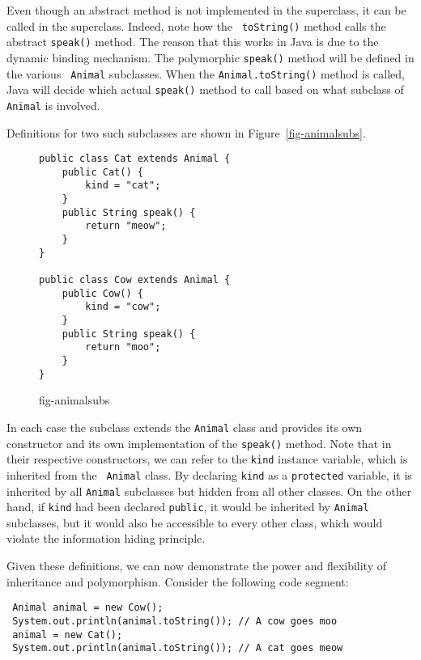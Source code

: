 Even though an abstract method is not implemented in the superclass,
it can be called in the superclass. Indeed, note how the {\tt
toString()} method calls the abstract {\tt speak()} method. The reason
that this works in Java is due to the dynamic binding mechanism.  The
polymorphic {\tt speak()} method will be defined in the various {\tt
Animal} subclasses. When the {\tt Animal.toString()} method is called,
Java will decide which actual {\tt speak()} method to call based on
what subclass of {\tt Animal} is involved.  

Definitions for two such subclasses are shown in
Figure~\ref{fig-animalsubs}.  
\begin{figure}[htb]
\jjjprogstart
\begin{jjjlisting}
\begin{lstlisting}
public class Cat extends Animal {
    public Cat() {
        kind = "cat";
    }
    public String speak() {
        return "meow";
    }
}

public class Cow extends Animal {
    public Cow() {
        kind = "cow";
    }
    public String speak() {
        return "moo";
    }
}
\end{lstlisting}
\end{jjjlisting}
{fig-animalsubs}
\end{figure}
\noindent In each case the subclass extends the {\tt Animal} class and provides
its own constructor and its own implementation of the {\tt speak()}
method. Note that in their respective constructors, we can refer to
the {\tt kind} instance variable, which is inherited from the {\tt
Animal} class.  By declaring {\tt kind} as a {\tt protected} variable,
it is inherited by all {\tt Animal} subclasses but hidden from
all other classes.  On the other hand, if {\tt kind} had been declared
{\tt public}, it would be inherited by {\tt Animal} subclasses, but it
would also be accessible to every other class, which would violate the
information hiding principle.

Given these definitions, we can now demonstrate the power and
flexibility of inheritance and polymorphism.  Consider the following
code segment:

\begin{jjjlisting}
\begin{lstlisting}
 Animal animal = new Cow();
 System.out.println(animal.toString()); // A cow goes moo
 animal = new Cat();
 System.out.println(animal.toString()); // A cat goes meow
\end{lstlisting}
\end{jjjlisting}

